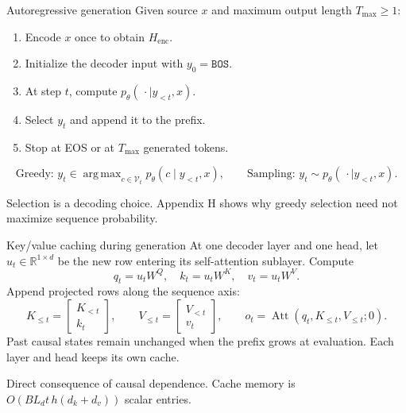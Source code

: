 \documentclass[aspectratio=169,11pt]{beamer}
\newcommand{\R}{\mathbb{R}}
\newcommand{\src}[1]{\par\vfill{\fontsize{7}{8.5}\selectfont\color{muted}#1}\par}
\DeclareMathOperator{\Att}{Att}
\DeclareMathOperator*{\argmax}{arg\,max}
\begin{document}
\begin{frame}[t]{Autoregressive generation}
Given source $x$ and maximum output length $T_{\max}\geq1$:
\begin{enumerate}
  \item Encode $x$ once to obtain $H_{\mathrm{enc}}$.
  \item Initialize the decoder input with $y_0=\texttt{BOS}$.
  \item At step $t$, compute $p_\theta(\,\cdot\mid y_{<t},x)$.
  \item Select $y_t$ and append it to the prefix.
  \item Stop at EOS or at $T_{\max}$ generated tokens.
\end{enumerate}
\[
 \text{Greedy: }y_t\in\argmax_{c\in\mathcal V_t}p_\theta(c\mid y_{<t},x),
 \qquad
 \text{Sampling: }y_t\sim p_\theta(\,\cdot\mid y_{<t},x).
\]
\src{Selection is a decoding choice. Appendix H shows why greedy selection need not maximize sequence probability.}
\end{frame}

\begin{frame}[t]{Key/value caching during generation}
At one decoder layer and one head, let $u_t\in\R^{1\times d}$ be the
new row entering its self-attention sublayer. Compute
\[
 q_t=u_tW^Q,\quad k_t=u_tW^K,\quad v_t=u_tW^V.
\]
Append projected rows along the sequence axis:
\[
 K_{\leq t}=\begin{bmatrix}K_{<t}\\k_t\end{bmatrix},\qquad
 V_{\leq t}=\begin{bmatrix}V_{<t}\\v_t\end{bmatrix},\qquad
 o_t=\Att(q_t,K_{\leq t},V_{\leq t};0).
\]
Past causal states remain unchanged when the prefix grows at evaluation.
Each layer and head keeps its own cache.
\src{Direct consequence of causal dependence. Cache memory is $O(BL_dt\,h(d_k+d_v))$ scalar entries.}
\end{frame}
\end{document}

